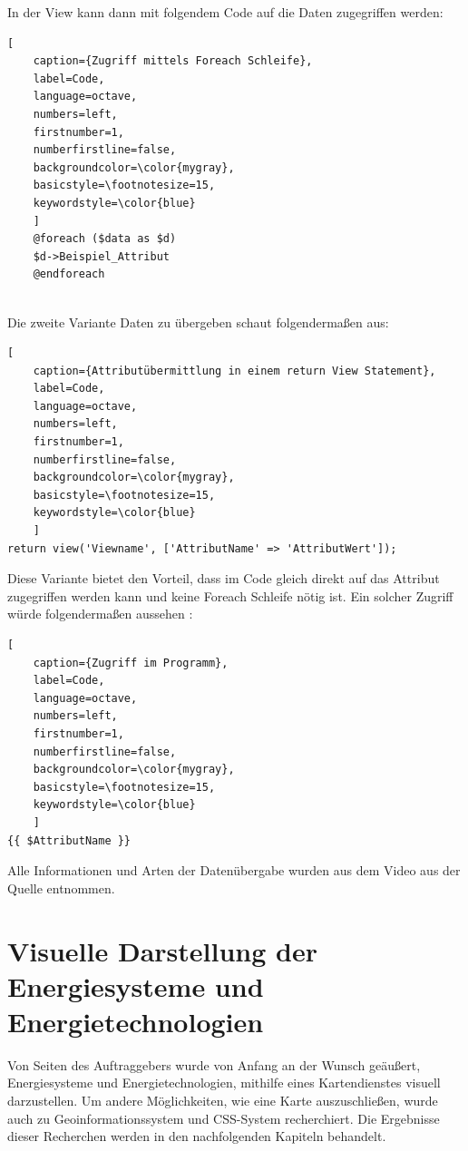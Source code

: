 In der View kann dann mit folgendem Code auf die Daten zugegriffen werden:
\renewcommand{\lstlistingname}{Quellcode}

\begin{lstlisting}[
	caption={Zugriff mittels Foreach Schleife},
	label=Code,
	language=octave,
	numbers=left,
	firstnumber=1,
	numberfirstline=false,
	backgroundcolor=\color{mygray},
	basicstyle=\footnotesize=15,
	keywordstyle=\color{blue}
	]
	@foreach ($data as $d)
	$d->Beispiel_Attribut 
	@endforeach
	
\end{lstlisting}

Die zweite Variante Daten zu übergeben schaut folgendermaßen aus:
\renewcommand{\lstlistingname}{Quellcode}

\begin{lstlisting}[
	caption={Attributübermittlung in einem return View Statement},
	label=Code,
	language=octave,
	numbers=left,
	firstnumber=1,
	numberfirstline=false,
	backgroundcolor=\color{mygray},
	basicstyle=\footnotesize=15,
	keywordstyle=\color{blue}
	]
return view('Viewname', ['AttributName' => 'AttributWert']);
\end{lstlisting}
\newpage

Diese Variante bietet den Vorteil, dass im Code gleich direkt auf das Attribut zugegriffen werden kann und keine  Foreach Schleife nötig ist. Ein solcher Zugriff würde folgendermaßen aussehen : 
\renewcommand{\lstlistingname}{Quellcode}

\begin{lstlisting}[
	caption={Zugriff im Programm},
	label=Code,
	language=octave,
	numbers=left,
	firstnumber=1,
	numberfirstline=false,
	backgroundcolor=\color{mygray},
	basicstyle=\footnotesize=15,
	keywordstyle=\color{blue}
	]
{{ $AttributName }}
\end{lstlisting}


Alle Informationen und Arten der Datenübergabe wurden aus dem Video aus der Quelle \cite{Video} entnommen.


\section {Visuelle Darstellung der Energiesysteme und Energietechnologien }
Von Seiten des Auftraggebers wurde von Anfang an der Wunsch geäußert, Energiesysteme und Energietechnologien, mithilfe eines Kartendienstes visuell darzustellen. Um andere Möglichkeiten, wie eine Karte auszuschließen, wurde auch zu Geoinformationssystem und CSS-System recherchiert. Die Ergebnisse dieser Recherchen werden in den nachfolgenden Kapiteln behandelt. 

